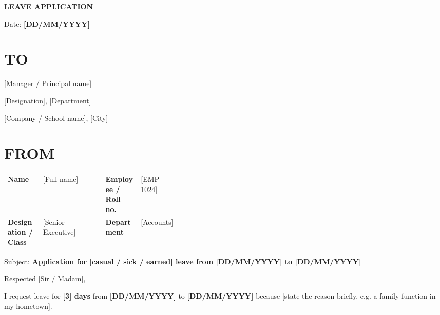 \documentclass[10pt]{article}
\begin{document}
\fontsize{10.5}{13.2}\selectfont
{\color{accent}\fontsize{30}{34}\selectfont\bfseries LEAVE APPLICATION}\par\vspace{3pt}

{\fontsize{13.5}{16}\selectfont Date: \textbf{[DD/MM/YYYY]}}\par\vspace{4pt}

\section{TO}

[Manager / Principal name]\par\vspace{4pt}

[Designation], [Department]\par\vspace{4pt}

[Company / School name], [City]\par\vspace{4pt}

\section{FROM}

\begin{tabularx}{\linewidth}{@{}p{0.2\linewidth}X p{0.2\linewidth}X@{}}
\textbf{Name} & [Full name] & \textbf{Employee / Roll no.} & [EMP-1024] \\
\textbf{Designation / Class} & [Senior Executive] & \textbf{Department} & [Accounts] \\
\end{tabularx}\par\vspace{2pt}

Subject: \textbf{Application for [casual / sick / earned] leave from [DD/MM/YYYY] to [DD/MM/YYYY]}\par\vspace{4pt}

Respected [Sir / Madam],\par\vspace{4pt}

I request leave for \textbf{[3] days} from \textbf{[DD/MM/YYYY]} to \textbf{[DD/MM/YYYY]} because [state the reason briefly, e.g. a family function in my hometown].\par\vspace{4pt}
\end{document}
